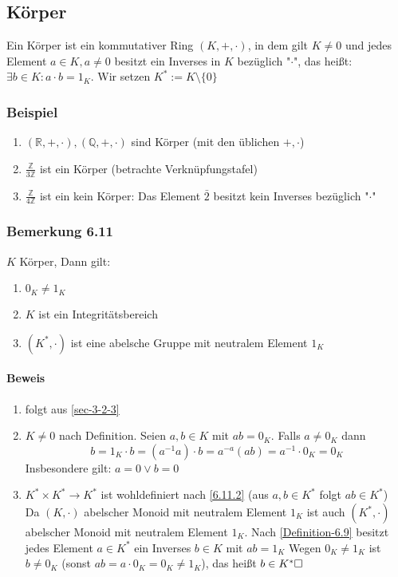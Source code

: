 \documentclass[a4paper]{scrartcl}
\theoremstyle{definition}
\theoremstyle{plain}
\theoremstyle{plain}
\theoremstyle{remark}
\theoremstyle{remark}
\theoremstyle{remark}
\theoremstyle{remark}
\theoremstyle{remark}
\begin{document}
\subsection{Körper}
\label{sec-3-3}
\label{Definition-6.9}
Ein Körper ist ein kommutativer Ring $(K,+,\cdot)$, in dem gilt $K\neq 0$ und jedes Element $a\in K, a\neq 0$ besitzt ein Inverses in $K$ bezüglich "$\cdot$", das heißt: $\exists b\in K:a\cdot b = 1_K$. Wir setzen $K^\ast := K\setminus\{0\}$
\subsubsection{Beispiel}
\label{sec-3-3-1}
\begin{enumerate}
\item $(\mathbb{R},+,\cdot),(\mathbb{Q},+,\cdot)$ sind Körper (mit den üblichen $+,\cdot$)
\item $\frac{\mathbb{Z}}{3\mathbb{Z}}$ ist ein Körper (betrachte Verknüpfungstafel)
\item $\frac{\mathbb{Z}}{4\mathbb{Z}}$ ist ein kein Körper: Das Element $\bar 2$ besitzt kein Inverses bezüglich "$\cdot$"
\end{enumerate}
\subsubsection{Bemerkung 6.11}
\label{sec-3-3-2}
\label{remark:integ_neutral}
$K$ Körper, Dann gilt:
\begin{enumerate}
\item $0_K \neq 1_K$
\item \label{6.11.2} $K$ ist ein Integritätsbereich
\item $(K^\ast,\cdot)$ ist eine abelsche Gruppe mit neutralem Element $1_K$
\end{enumerate}
\paragraph{Beweis}
\label{sec-3-3-2-1}
\begin{enumerate}
\item folgt aus \ref{sec-3-2-3}
\item $K\neq 0$ nach Definition. Seien $a,b\in K$ mit $a b = 0_K$. Falls $a\neq 0_K$ dann
\[b = 1_K \cdot b = (a^{-1} a)\cdot b = a^{-a}(a b) = a^{-1}\cdot 0_K = 0_K\]
Insbesondere gilt: $a = 0\vee b = 0$
\item $K^\ast\times K^\ast \to K^\ast$ ist wohldefiniert nach \ref{6.11.2} (aus $a,b\in K^\ast$ folgt $a b\in K^\ast$) \\
                Da $(K,\cdot)$ abelscher Monoid mit neutralem Element $1_K$ ist auch $(K^\ast,\cdot)$ abelscher Monoid mit neutralem Element $1_K$.
Nach \ref{Definition-6.9} besitzt jedes Element $a\in K^\ast$ ein Inverses $b\in K$ mit $a b = 1_K$ Wegen $0_K \neq 1_K$ ist $b\neq 0_K$ (sonst $a b = a\cdot 0_K = 0_K \neq 1_K$), das heißt $b\in K^\ast\hfill\square$
\end{enumerate}
\end{document}
